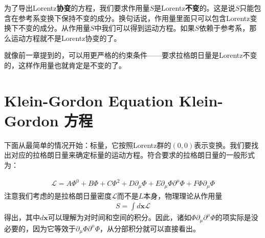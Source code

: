 为了导出Lorentz{\bfseries 协变}的方程，我们要求作用量$S$是Lorentz{\bfseries 不变}的。这是说$S$只能包含在参考系变换下保持不变的成分。换句话说，作用量里面只可以包含Lorentz变换下不变的成分。从作用量$S$中我们可以得到运动方程。如果$S$依赖于参考系，那么运动方程就不是Lorentz协变的了。

就像前一章提到的，可以用更严格的约束条件——要求拉格朗日量是Lorentz不变的，这样作用量也就肯定是不变的了。

\section[Klein-Gordon 方程]{Klein-Gordon Equation \quad Klein-Gordon 方程}\label{sec6.2}

下面从最简单的情况开始：标量，它按照Lorentz群的$(0,0)$表示变换。我们要找出对应的拉格朗日量来确定标量的运动方程。符合要求的拉格朗日量的一般形式为：

\begin{align}
\label{equ6.1}
\mathscr{L} = A\Phi^0+B\Phi+C\Phi^2+D\partial_\mu\Phi+E\partial_\mu\Phi\partial^\mu\Phi+F\Phi\partial_\mu\Phi
\end{align}
注意我们考虑的是拉格朗日量密度$\mathscr{L}$而不是$L$本身，物理理论从作用量
\begin{align}
\label{equ6.2}
S = \int d\mathbf{x} \mathscr{L}
\end{align}
得出，其中$d \mathbf{x}$可以理解为对时间和空间的积分。因此，诸如$\Phi\partial_\mu\partial^\mu\Phi$的项实际是没必要的，因为它等效于$\partial_\mu\Phi\partial^\mu\Phi$，从分部积分就可以直接看出。

